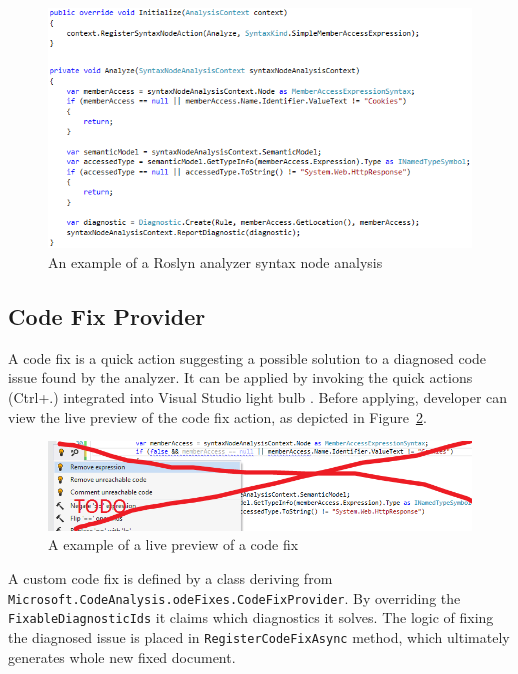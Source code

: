 \documentclass[
  digital, %
  table,   %
  lof,     %
  lot,     %
  oneside,
]{fithesis3}
\begin{document}
\begin{figure}[h!]
		\centering
			\includegraphics[scale=0.73]{img/analyzer-example}
		\caption{An example of a Roslyn analyzer syntax node analysis}
		\label{fig:analyzer-example}
\end{figure}

\subsection{Code Fix Provider}
A code fix is a quick action suggesting a possible solution to a diagnosed code issue found by the analyzer. It can be applied by invoking the quick actions (Ctrl+.) integrated into Visual Studio light bulb . Before applying, developer can view the live preview of the code fix action, as depicted in Figure~\ref{fig:codefix-example}.

\begin{figure}[h!]
		\centering
			\includegraphics[scale=0.65]{img/codefix-example}
		\caption{A example of a live preview of a code fix}
		\label{fig:codefix-example}
\end{figure}

A custom code fix is defined by a class deriving from \texttt{Microsoft.CodeAnalysis.odeFixes.CodeFixProvider}. By overriding the \texttt{FixableDiagnosticIds} it claims which diagnostics it solves. The logic of fixing the diagnosed issue is placed in \texttt{RegisterCodeFixAsync} method, which ultimately generates whole new fixed document.
\end{document}
